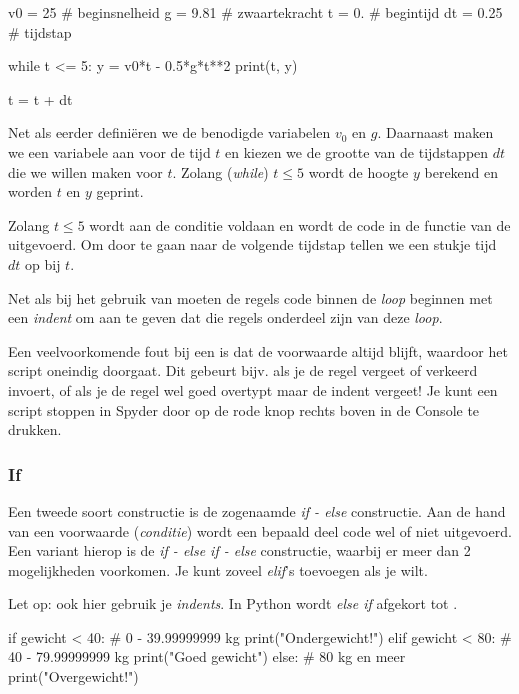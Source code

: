 \documentclass[a4paper,11pt, fleqn]{article}
\begin{document}
\begin{python}
v0 = 25   # beginsnelheid
g = 9.81  # zwaartekracht
t = 0.    # begintijd
dt = 0.25 # tijdstap

while t <= 5:
    y = v0*t - 0.5*g*t**2
    print(t, y)
    
    t = t + dt
\end{python}

Net als eerder defini\"eren we de benodigde variabelen $v_0$ en $g$. Daarnaast maken we een variabele aan voor de tijd $t$ en kiezen we de grootte van de tijdstappen $dt$ die we willen maken voor $t$. Zolang (\textit{while}) $t \leq 5$ wordt de hoogte $y$ berekend en worden $t$ en $y$ geprint.

Zolang $t\le5$ wordt aan de conditie voldaan en wordt de code in de functie van de  uitgevoerd. Om door te gaan naar de volgende tijdstap tellen we een stukje tijd $dt$ op bij $t$. 

Net als bij het gebruik van  moeten de regels code binnen de  \textit{loop} beginnen met een \textit{indent} om aan te geven dat die regels onderdeel zijn van deze \textit{loop}.

Een veelvoorkomende fout bij een  is dat de voorwaarde altijd  blijft, waardoor het script oneindig doorgaat. Dit gebeurt bijv. als je de regel  vergeet of verkeerd invoert, of als je de regel wel goed overtypt maar de indent vergeet! Je kunt een script stoppen in Spyder door op de rode knop rechts boven in de Console te drukken.

\subsubsection{If}
Een tweede soort constructie is de zogenaamde \textit{if - else} constructie. Aan de hand van een voorwaarde (\textit{conditie}) wordt een bepaald deel code wel of niet uitgevoerd. Een variant hierop is de \textit{if - else if - else} constructie, waarbij er meer dan 2 mogelijkheden voorkomen. Je kunt zoveel {\it elif}'s toevoegen als je wilt.

Let op: ook hier gebruik je \textit{indents}. In Python wordt \textit{else if} afgekort tot . 

\begin{python}
if gewicht < 40:            # 0 - 39.99999999 kg
    print("Ondergewicht!")
elif gewicht < 80:          # 40 - 79.99999999 kg
    print("Goed gewicht")
else:                       # 80 kg en meer
    print("Overgewicht!")
\end{python}
\end{document}
